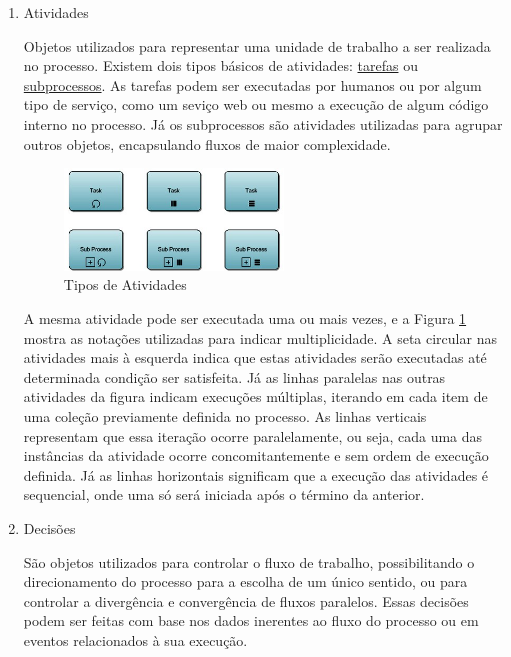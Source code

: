 \begin{enumerate}
    
    \item Atividades
    
    Objetos utilizados para representar uma unidade de trabalho a ser realizada no processo. Existem dois tipos básicos de atividades: \underline{tarefas} ou \underline{subprocessos}. As tarefas podem ser executadas por humanos ou por algum tipo de serviço, como um seviço web ou mesmo a execução de algum código interno no processo. Já os subprocessos são atividades utilizadas para agrupar outros objetos, encapsulando fluxos de maior complexidade.
    
    \begin{figure}[H]
    \centering
    \includegraphics[width=0.55\textwidth]{imagens/bpmn_activities.jpg}
    \caption{Tipos de Atividades\cite{tipos_atividades}}
    \label{fig:bpmn_activities}
    \end{figure}
    
    A mesma atividade pode ser executada uma ou mais vezes, e a Figura \ref{fig:bpmn_activities} mostra as notações utilizadas para indicar multiplicidade. A seta circular nas atividades mais à esquerda indica que estas atividades serão executadas até determinada condição ser satisfeita. Já as linhas paralelas nas outras atividades da figura indicam execuções múltiplas, iterando em cada item de uma coleção previamente definida no processo. As linhas verticais representam que essa iteração ocorre paralelamente, ou seja, cada uma das instâncias da atividade ocorre concomitantemente e sem ordem de execução definida. Já as linhas horizontais significam que a execução das atividades é sequencial, onde uma só será iniciada após o término da anterior.
    
    \item Decisões
    
    São objetos utilizados para controlar o fluxo de trabalho, possibilitando o direcionamento do processo para a escolha de um único sentido, ou para controlar a divergência e convergência de fluxos paralelos. Essas decisões podem ser feitas com base nos dados inerentes ao fluxo do processo ou em eventos relacionados à sua execução.
    

\end{enumerate}
